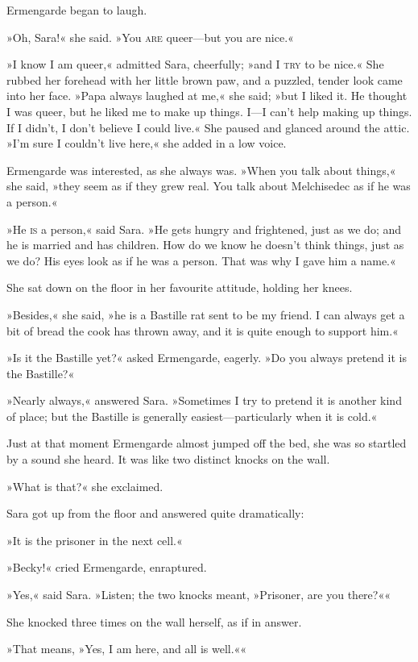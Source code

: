 Ermengarde began to laugh.

»Oh, Sara!« she said. »You \textsc{are} queer—but you are nice.«

»I know I am queer,« admitted Sara, cheerfully; »and I \textsc{try} to be nice.« She rubbed her forehead with her little brown paw, and a puzzled, tender look came into her face. »Papa always laughed at me,« she said; »but I liked it. He thought I was queer, but he liked me to make up things. I—I can't help making up things. If I didn't, I don't believe I could live.« She paused and glanced around the attic. »I'm sure I couldn't live here,« she added in a low voice.

Ermengarde was interested, as she always was. »When you talk about things,« she said, »they seem as if they grew real. You talk about Melchisedec as if he was a person.«

»He \textsc{is} a person,« said Sara. »He gets hungry and frightened, just as we do; and he is married and has children. How do we know he doesn't think things, just as we do? His eyes look as if he was a person. That was why I gave him a name.«

She sat down on the floor in her favourite attitude, holding her knees.

»Besides,« she said, »he is a Bastille rat sent to be my friend. I can always get a bit of bread the cook has thrown away, and it is quite enough to support him.«

»Is it the Bastille yet?« asked Ermengarde, eagerly. »Do you always pretend it is the Bastille?«

»Nearly always,« answered Sara. »Sometimes I try to pretend it is another kind of place; but the Bastille is generally easiest—particularly when it is cold.«

Just at that moment Ermengarde almost jumped off the bed, she was so startled by a sound she heard. It was like two distinct knocks on the wall.

»What is that?« she exclaimed.

Sara got up from the floor and answered quite dramatically:

»It is the prisoner in the next cell.«

»Becky!« cried Ermengarde, enraptured.

»Yes,« said Sara. »Listen; the two knocks meant, »Prisoner, are you there?««

She knocked three times on the wall herself, as if in answer.

»That means, »Yes, I am here, and all is well.««

